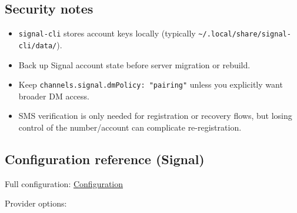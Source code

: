 \subsection{Security notes}


\begin{itemize}
  \item \texttt{signal-cli} stores account keys locally (typically \texttt{\textasciitilde{}/.local/share/signal-cli/data/}).
  \item Back up Signal account state before server migration or rebuild.
  \item Keep \texttt{channels.signal.dmPolicy: "pairing"} unless you explicitly want broader DM access.
  \item SMS verification is only needed for registration or recovery flows, but losing control of the number/account can complicate re-registration.
\end{itemize}


\subsection{Configuration reference (Signal)}


Full configuration: \href{/gateway/configuration}{Configuration}

Provider options:


